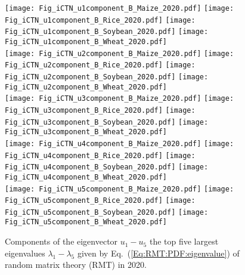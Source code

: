 \documentclass[preprint,3p,times,sort&compress]{elsarticle}
\begin{document}
 \begin{figure}[h!]
      \centering
      \texttt{[image: Fig\_iCTN\_u1component\_B\_Maize\_2020.pdf]}
      \texttt{[image: Fig\_iCTN\_u1component\_B\_Rice\_2020.pdf]}
      \texttt{[image: Fig\_iCTN\_u1component\_B\_Soybean\_2020.pdf]}
      \texttt{[image: Fig\_iCTN\_u1component\_B\_Wheat\_2020.pdf]}
       \\
      \texttt{[image: Fig\_iCTN\_u2component\_B\_Maize\_2020.pdf]}
      \texttt{[image: Fig\_iCTN\_u2component\_B\_Rice\_2020.pdf]}
      \texttt{[image: Fig\_iCTN\_u2component\_B\_Soybean\_2020.pdf]}
      \texttt{[image: Fig\_iCTN\_u2component\_B\_Wheat\_2020.pdf]}
       \\
      \texttt{[image: Fig\_iCTN\_u3component\_B\_Maize\_2020.pdf]}
      \texttt{[image: Fig\_iCTN\_u3component\_B\_Rice\_2020.pdf]}
      \texttt{[image: Fig\_iCTN\_u3component\_B\_Soybean\_2020.pdf]}
      \texttt{[image: Fig\_iCTN\_u3component\_B\_Wheat\_2020.pdf]}
       \\
      \texttt{[image: Fig\_iCTN\_u4component\_B\_Maize\_2020.pdf]}
      \texttt{[image: Fig\_iCTN\_u4component\_B\_Rice\_2020.pdf]}
      \texttt{[image: Fig\_iCTN\_u4component\_B\_Soybean\_2020.pdf]}
      \texttt{[image: Fig\_iCTN\_u4component\_B\_Wheat\_2020.pdf]}
       \\
      \texttt{[image: Fig\_iCTN\_u5component\_B\_Maize\_2020.pdf]}
      \texttt{[image: Fig\_iCTN\_u5component\_B\_Rice\_2020.pdf]}
      \texttt{[image: Fig\_iCTN\_u5component\_B\_Soybean\_2020.pdf]}
      \texttt{[image: Fig\_iCTN\_u5component\_B\_Wheat\_2020.pdf]}
      \caption{Components of the eigenvector $u_1-u_5$ the top five largest  eigenvalues $\lambda_1-\lambda_5$ given by Eq.~(\ref{Eq:RMT:PDF:eigenvalue}) of random matrix theory (RMT) in 2020.}
      \label{Fig:iCTN:PDF:eigenvalue:1-5:2020}
\end{figure}
\end{document}
